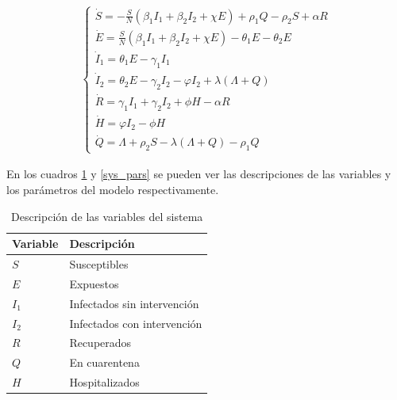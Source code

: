 \documentclass[conference]{IEEEtran}
\begin{document}
\begin{equation}   
    \begin{aligned}
    \left\{
        \begin{array}{l} 
        \dot{S} = - \frac{S}{N}\left( {{\beta _1}{I_1} + {\beta _2}{I_2} + \chi E} \right) + {\rho _1}Q - {\rho _2}S + \alpha R
        \\ 
        \dot{ E} = \frac{S}{N}\left( {{\beta _1}{I_1} + {\beta _2}{I_2} + \chi E} \right) - {\theta _1}E - {\theta _2}E
        \\ 
        {\dot{I}}_1 = {\theta _1}E - {\gamma _1}{I_1}
        \\ 
        \dot{I}_2 = {\theta _2}E - {\gamma _2}{I_2} - \varphi {I_2} + \lambda \left( \varLambda + Q \right) 
        \\ 
        \dot{R} = {\gamma _1}{I_1} + {\gamma _2}{I_2} + \phi H - \alpha R
        \\ 
        \dot{H} = \varphi {I_2} - \phi H
        \\ 
        \dot{Q} = \varLambda + {\rho _2}S - \lambda \left( {\varLambda + Q} \right) - {\rho _1}Q 
    \end{array} 
    \right.
    \end{aligned}
\end{equation}

En los cuadros \ref{var_desc} y \ref{sys_pars} se pueden ver las descripciones de las
variables y los parámetros del modelo respectivamente.

\begin{table}[h]
    \centering
    \begin{tabular}{ll}
    \hline
    Variable & Descripción                 \\ \hline
    $S$      & Susceptibles                \\ 
    $E$      & Expuestos                   \\ 
    $I_1$    & Infectados sin intervención \\ 
    $I_2$    & Infectados con intervención \\ 
    $R$      & Recuperados                 \\ 
    $Q$      & En cuarentena               \\ 
    $H$      & Hospitalizados              \\ \hline
    \end{tabular}
    \caption{Descripción de las variables del sistema}
    \label{var_desc}
\end{table}
\end{document}
